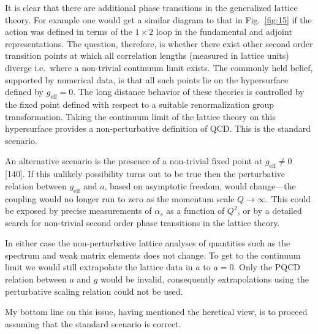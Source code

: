 It is clear that there are additional phase transitions in the generalized lattice theory. For example one would get a similar diagram to that in Fig.~\ref{fig:15} if the action was defined in terms of the $1 \times 2$ loop in the fundamental and adjoint representations. The question, therefore, is whether there exist other second order transition points at which all correlation lengths (measured in lattice units) diverge i.e.~where a non-trivial continuum limit exists. The commonly held belief, supported by numerical data, is that all such points lie on the hypersurface defined by $g_{\mathrm{eff}} = 0$. The long distance behavior of these theories is controlled by the fixed point defined with respect to a suitable renormalization group transformation. Taking the continuum limit of the lattice theory on this hypersurface provides a non-perturbative definition of QCD. This is the standard scenario.

An alternative scenario is the presence of a non-trivial fixed point at $g_{\mathrm{eff}} \neq 0$ [140]. If this unlikely possibility turns out to be true then the perturbative relation between $g_{\mathrm{eff}}$ and $a$, based on asymptotic freedom, would change---the coupling would no longer run to zero as the momentum scale $Q \to \infty$. This could be exposed by precise measurements of $\alpha_s$ as a function of $Q^2$, or by a detailed search for non-trivial second order phase transitions in the lattice theory.

In either case the non-perturbative lattice analyses of quantities such as the spectrum and weak matrix elements does not change. To get to the continuum limit we would still extrapolate the lattice data in $a$ to $a = 0$. Only the PQCD relation between $a$ and $g$ would be invalid, consequently extrapolations using the perturbative scaling relation could not be used.

My bottom line on this issue, having mentioned the heretical view, is to proceed assuming that the standard scenario is correct.
